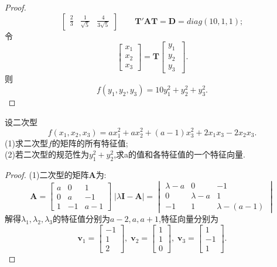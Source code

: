 \documentclass[lang=cn,11pt,normal]{elegantbook}
\renewcommand{\AA}{\boldsymbol{A}}
\newcommand{\DD}{\boldsymbol{D}}
\newcommand{\II}{\boldsymbol{I}}
\newcommand{\TT}{\boldsymbol{T}}
\begin{document}
\begin{proof}
\begin{equation}
\begin{bmatrix}
		\frac{2}{3}&\frac{1}{\sqrt{5}}&\frac{4}{3\sqrt{5}}
		\end{bmatrix}
		\qquad\TT'\boldsymbol{AT}=\DD=diag\left(10,1,1\right);
		\end{equation}
		令
		\begin{equation}
		\begin{bmatrix}
		x_1\\x_2\\x_3
		\end{bmatrix}
		=
		\TT
		\begin{bmatrix}
		y_1\\y_2\\y_3\
		\end{bmatrix}.
		\end{equation}
		则
		\begin{equation}
		f(y_1,y_2,y_3)=10y_1^2+y_2^2+y_3^2.
		\end{equation}
	\end{proof}
	\begin{exercise}
		设二次型
		\begin{equation}
		f(x_1,x_2,x_3)=ax_1^2+ax_2^2+(a-1)x_3^2+2x_1x_3-2x_2x_3.
		\end{equation}
		(1)求二次型$f$的矩阵的所有特征值;\\
		(2)若二次型的规范性为$y_1^2+y_2^2$,求a的值和各特征值的一个特征向量.
	\end{exercise}
	\begin{proof}
		(1)二次型的矩阵$\AA$为:
		\begin{equation}
		\AA=
		\begin{bmatrix}
		a&0&1\\
		0&a&-1\\
		1&-1&a-1
		\end{bmatrix}\;
		|\lambda\II-\AA|=
		\begin{vmatrix}
		\lambda-a&0&-1\\
		0&\lambda-a&1\\
		-1&1&\lambda-(a-1)
		\end{vmatrix}
		\end{equation}
		解得$\lambda_1,\lambda_2,\lambda_3$的特征值分别为$a-2,a,a+1$,特征向量分别为
		\begin{equation}
		\boldsymbol{v}_1=\begin{bmatrix}-1\\1\\2\end{bmatrix},\;\boldsymbol{v}_2=\begin{bmatrix}1\\1\\0\end{bmatrix},\;\boldsymbol{v}_3=\begin{bmatrix}1\\-1\\1\end{bmatrix}.
		\end{equation}
	\end{proof}
\end{document}
